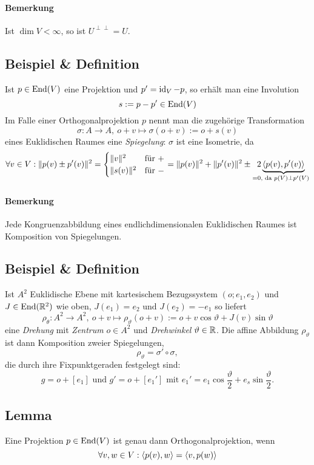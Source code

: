 \paragraph{Bemerkung}
	Ist $ \dim V < \infty $, so ist $ U^{\perp\perp} = U$.

\subsection{Beispiel \& Definition}
	Ist $ p\in \operatorname{End}(V) $ eine Projektion und $ p' = \operatorname{id}_V -p $, so erhält man eine Involution
		\[ s := p-p' \in \operatorname{End}(V) \]
	Im Falle einer Orthogonalprojektion $ p $ nennt man die zugehörige Transformation	
		\[ \sigma: A\to A,\ o+v\mapsto \sigma(o+v):= o+s(v) \]
	eines Euklidischen Raumes eine \emph{Spiegelung}: $ \sigma $ ist eine Isometrie, da
		\[ \forall v\in V: \|p(v)\pm p'(v)\|^2 =
			\begin{cases}
				\|v\|^2 &\text{für }+\\ \|s(v)\|^2 &\text{für } -
			\end{cases}
			= \|p(v)\|^2+\|p'(v)\|^2 \pm \underset{ = 0\text{, da }p(V)\perp p'(V)}{2\underbrace{\langle p(v),p'(v) \rangle}} \]
\paragraph{Bemerkung}
	Jede Kongruenzabbildung eines endlichdimensionalen Euklidischen Raumes ist Komposition von Spiegelungen.

\subsection{Beispiel \& Definition}
	Ist $ A^2 $ Euklidische Ebene mit kartesischem Bezugssystem $ (o;e_1,e_2) $ und $ J\in \operatorname{End}(\mathbb{R}^2) $ wie oben,
	$ J(e_1) = e_2 \text{ und } J(e_2) = -e_1 $
	so liefert 
		\[ \rho_\theta : A^2\to A^2,\ o+v\mapsto \rho_\vartheta(o+v):= o+v\cos \vartheta + J(v)\sin\vartheta \]
	eine \emph{Drehung} mit \emph{Zentrum} $ o\in A^2 $ und \emph{Drehwinkel} $ \vartheta \in \mathbb{R} $. Die affine Abbildung $ \rho_\vartheta $ ist dann Komposition zweier Spiegelungen, 
		\[ \rho_\vartheta= \sigma'\circ \sigma, \]
	die durch ihre Fixpunktgeraden festgelegt sind:
		\[ g = o + [e_1] \text{ und }g' = o+[e_1'] \text{ mit } e_1' = e_1 \cos\frac{\vartheta}{2}+e_s\sin \frac{\vartheta}{2}. \]
	

\subsection{Lemma}
\begin{Lemma}\label{sadj}
	Eine Projektion $ p\in \operatorname{End}(V) $ ist genau dann Orthogonalprojektion, wenn
		\[ \forall v,w\in V: \langle p(v),w \rangle = \langle v,p(w) \rangle \]
\end{Lemma}
